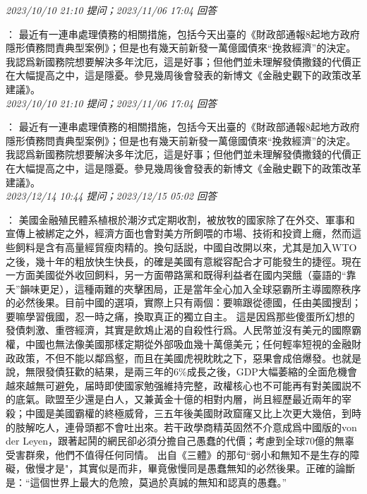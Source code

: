 \documentclass[twocolumn]{ctexart}
\begin{document}
\textit{\hfill\noindent\small 2023/10/10 21:10 提问；2023/11/06 17:04 回答}

：
最近有一連串處理債務的相關措施，包括今天出臺的《財政部通報8起地方政府隱形債務問責典型案例》；但是也有幾天前新發一萬億國債來“挽救經濟”的決定。
我認爲新國務院想要解決多年沈厄，這是好事；但他們並未理解發債撒錢的代價正在大幅提高之中，這是隱憂。參見幾周後會發表的新博文《金融史觀下的政策改革建議》。
\\

\textit{\hfill\noindent\small 2023/10/10 21:10 提问；2023/11/06 17:04 回答}

：
最近有一連串處理債務的相關措施，包括今天出臺的《財政部通報8起地方政府隱形債務問責典型案例》；但是也有幾天前新發一萬億國債來“挽救經濟”的決定。
我認爲新國務院想要解決多年沈厄，這是好事；但他們並未理解發債撒錢的代價正在大幅提高之中，這是隱憂。參見幾周後會發表的新博文《金融史觀下的政策改革建議》。
\\

\textit{\hfill\noindent\small 2023/12/14 10:44 提问；2023/12/15 05:02 回答}

：
美國金融殖民體系植根於潮汐式定期收割，被放牧的國家除了在外交、軍事和宣傳上被綁定之外，經濟方面也會對美方所飼喂的市場、技術和投資上癮，然而這些飼料是含有高量經貿瘦肉精的。換句話説，中國自改開以來，尤其是加入WTO之後，幾十年的粗放快生快長，的確是美國有意縱容配合才可能發生的捷徑。現在一方面美國從外收回飼料，另一方面帶路黨和既得利益者在國内哭餓（臺語的“靠夭”韻味更足），這種兩難的夾擊困局，正是當年全心加入全球惡霸所主導國際秩序的必然後果。目前中國的選項，實際上只有兩個：要嘛跟從德國，任由美國搜刮；要嘛學習俄國，忍一時之痛，換取真正的獨立自主。
這是因爲那些傻蛋所幻想的發債刺激、重啓經濟，其實是飲鴆止渴的自殺性行爲。人民幣並沒有美元的國際霸權，中國也無法像美國那樣定期從外部吸血幾十萬億美元；任何輕率短視的金融財政政策，不但不能以鄰爲壑，而且在美國虎視眈眈之下，惡果會成倍爆發。也就是說，無限發債狂歡的結果，是兩三年的6\%成長之後，GDP大幅萎縮的全面危機會越來越無可避免，届時即使國家勉强維持完整，政權核心也不可能再有對美國説不的底氣。歐盟至少還是白人，又兼黃金十億的相對内層，尚且經歷最近兩年的宰殺；中國是美國霸權的終極威脅，三五年後美國財政窟窿又比上次更大幾倍，到時的肢解吃人，連骨頭都不會吐出來。若干政學商精英固然不介意成爲中國版的von der Leyen，跟著起鬨的網民卻必須分擔自己愚蠢的代價；考慮到全球70億的無辜受害群衆，他們不值得任何同情。
出自《三體》的那句“弱小和無知不是生存的障礙，傲慢才是"，其實似是而非，畢竟傲慢同是愚蠢無知的必然後果。正確的論斷是：“這個世界上最大的危險，莫過於真誠的無知和認真的愚蠢。”
\\
\end{document}
